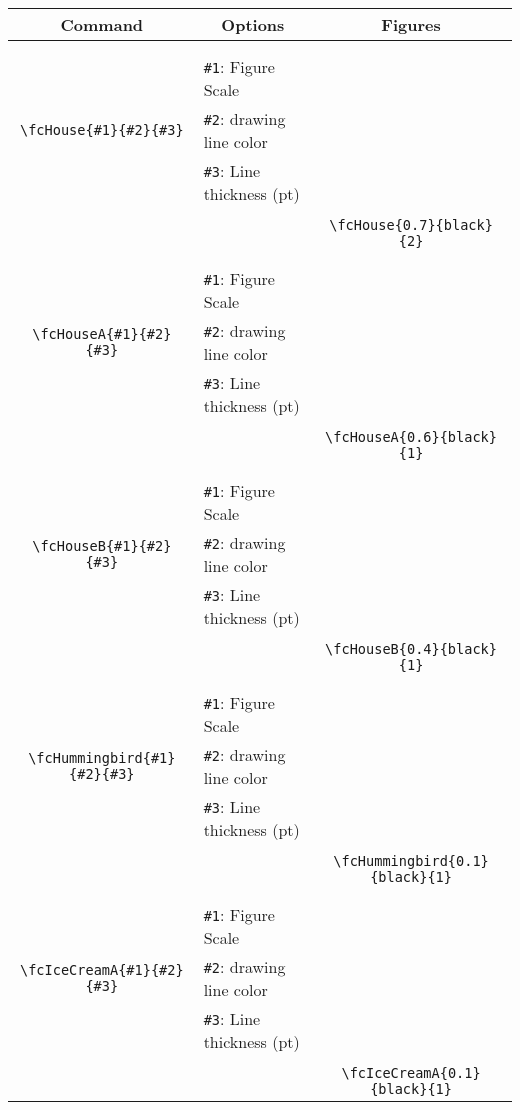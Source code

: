 \documentclass[x11names]{article}
\begin{document}
\begin{table}[H]\centering\begin{tabular}{|c|l|c|}\hline {\bf Command}& \multicolumn{1}{c|}{{\bf Options}} & {\bf Figures}\\  \hline	&&\multirow{5}{*}{\fcHouse{0.7}{black}{2}}\\	&&\\	&\verb|#1|: Figure Scale &\\	\verb|\fcHouse{#1}{#2}{#3}|&	\verb|#2|: drawing line color &\\	&\verb|#3|: Line thickness (pt) &\\ &&\\&&	\verb|\fcHouse{0.7}{black}{2}|\\\hline 	
	&&\multirow{5}{*}{\fcHouseA{0.6}{black}{1}}\\	&&\\	&\verb|#1|: Figure Scale &\\	\verb|\fcHouseA{#1}{#2}{#3}|&	\verb|#2|: drawing line color &\\	&\verb|#3|: Line thickness (pt) &\\ &&\\&&	\verb|\fcHouseA{0.6}{black}{1}|\\\hline 	
	&&\multirow{5}{*}{\fcHouseB{0.4}{black}{1}}\\	&&\\	&\verb|#1|: Figure Scale &\\	\verb|\fcHouseB{#1}{#2}{#3}|&	\verb|#2|: drawing line color &\\	&\verb|#3|: Line thickness (pt) &\\ &&\\&&	\verb|\fcHouseB{0.4}{black}{1}|\\\hline 	
	&&\multirow{5}{*}{\fcHummingbird{0.1}{black}{1}}\\	&&\\	&\verb|#1|: Figure Scale &\\	\verb|\fcHummingbird{#1}{#2}{#3}|&	\verb|#2|: drawing line color &\\	&\verb|#3|: Line thickness (pt) &\\ &&\\&&	\verb|\fcHummingbird{0.1}{black}{1}|\\\hline 	
	&&\multirow{5}{*}{\fcIceCreamA{0.1}{black}{1}}\\	&&\\	&\verb|#1|: Figure Scale &\\	\verb|\fcIceCreamA{#1}{#2}{#3}|&	\verb|#2|: drawing line color &\\	&\verb|#3|: Line thickness (pt) &\\ &&\\&&	\verb|\fcIceCreamA{0.1}{black}{1}|\\\hline 	

\end{tabular}
\end{table}
\end{document}
